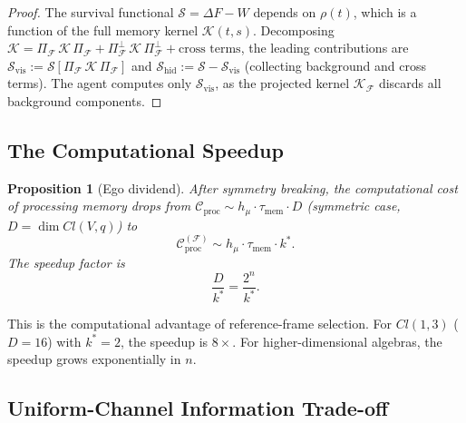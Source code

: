\documentclass[12pt,a4paper,openany]{book}
\newtheorem{proposition}[theorem]{Proposition}
\begin{document}
\begin{proof}
The survival functional $\mathcal{S} = \Delta F - W$ depends
on $\rho(t)$, which is a function of the full memory kernel
$\mathcal{K}(t,s)$.
Decomposing
$\mathcal{K} = \Pi_{\mathcal{F}}\,\mathcal{K}\,
\Pi_{\mathcal{F}}
+ \Pi_{\mathcal{F}}^{\perp}\,\mathcal{K}\,
\Pi_{\mathcal{F}}^{\perp}
+ \text{cross terms}$,
the leading contributions are
$\mathcal{S}_{\mathrm{vis}} := \mathcal{S}[
\Pi_{\mathcal{F}}\,\mathcal{K}\,\Pi_{\mathcal{F}}]$
and
$\mathcal{S}_{\mathrm{hid}} := \mathcal{S} -
\mathcal{S}_{\mathrm{vis}}$
(collecting background and cross terms).
The agent computes only
$\mathcal{S}_{\mathrm{vis}}$, as the projected kernel
$\mathcal{K}_{\mathcal{F}}$ discards all background
components.
\end{proof}

\subsection{The Computational Speedup}
\label{II-subsec:speedup}

\begin{proposition}[Ego dividend]
\label{II-prop:speedup}
After symmetry breaking, the computational cost of
processing memory drops from
$\mathcal{C}_{\mathrm{proc}} \sim h_\mu \cdot
\tau_{\mathrm{mem}} \cdot D$
(symmetric case, $D = \dim Cl(V,q)$) to
\begin{equation}
\label{II-eq:speedup}
\mathcal{C}_{\mathrm{proc}}^{(\mathcal{F})}
\sim h_\mu \cdot \tau_{\mathrm{mem}}
     \cdot k^*.
\end{equation}
The speedup factor is
\begin{equation}
\label{II-eq:speedup_factor}
\frac{D}{k^*} = \frac{2^n}{k^*}.
\end{equation}
\end{proposition}

This is the computational advantage of reference-frame
selection.
For $Cl(1,3)$ ($D = 16$) with $k^* = 2$, the speedup is
$8\times$.
For higher-dimensional algebras, the speedup grows
exponentially in $n$.

\subsection{Uniform-Channel Information Trade-off}
\label{II-subsec:tradeoff}
\end{document}

